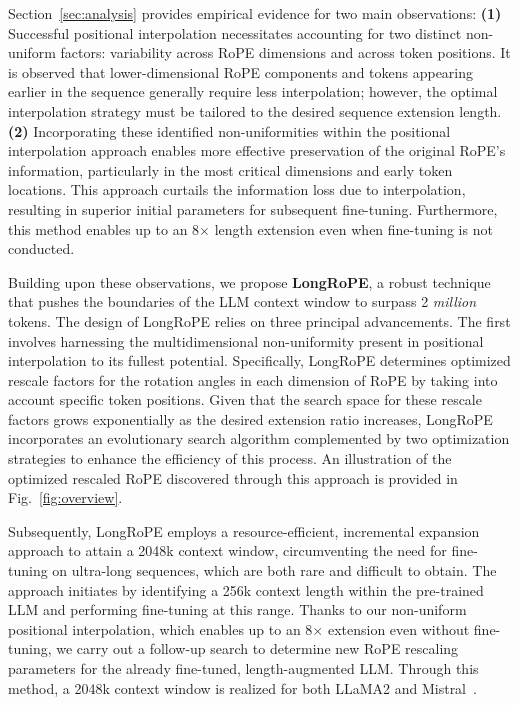 Section~\ref{sec:analysis} provides empirical evidence for two main observations: \textbf{(1)} Successful positional interpolation necessitates accounting for two distinct non-uniform factors: variability across RoPE dimensions and across token positions. It is observed that lower-dimensional RoPE components and tokens appearing earlier in the sequence generally require less interpolation; however, the optimal interpolation strategy must be tailored to the desired sequence extension length.
  \textbf{(2)} Incorporating these identified non-uniformities within the positional interpolation approach enables more effective preservation of the original RoPE’s information, particularly in the most critical dimensions and early token locations. This approach curtails the information loss due to interpolation, resulting in superior initial parameters for subsequent fine-tuning. Furthermore, this method enables up to an 8$\times$ length extension even when fine-tuning is not conducted.

Building upon these observations, we propose \textbf{LongRoPE}, a robust technique that pushes the boundaries of the LLM context window to surpass 2 \emph{million} tokens. The design of LongRoPE relies on three principal advancements. The first involves harnessing the multidimensional non-uniformity present in positional interpolation to its fullest potential. Specifically, {LongRoPE} determines optimized rescale factors for the rotation angles in each dimension of RoPE by taking into account specific token positions. Given that the search space for these rescale factors grows exponentially as the desired extension ratio increases, {LongRoPE} incorporates an evolutionary search algorithm complemented by two optimization strategies to enhance the efficiency of this process. An illustration of the optimized rescaled RoPE discovered through this approach is provided in Fig.~\ref{fig:overview}.

Subsequently, {LongRoPE} employs a resource-efficient, incremental expansion approach to attain a 2048k context window, circumventing the need for fine-tuning on ultra-long sequences, which are both rare and difficult to obtain. The approach initiates by identifying a 256k context length within the pre-trained LLM and performing fine-tuning at this range. Thanks to our non-uniform positional interpolation, which enables up to an 8$\times$ extension even without fine-tuning, we carry out a follow-up search to determine new RoPE rescaling parameters for the already fine-tuned, length-augmented LLM. Through this method, a 2048k context window is realized for both LLaMA2 and Mistral~\cite{mistral}.

